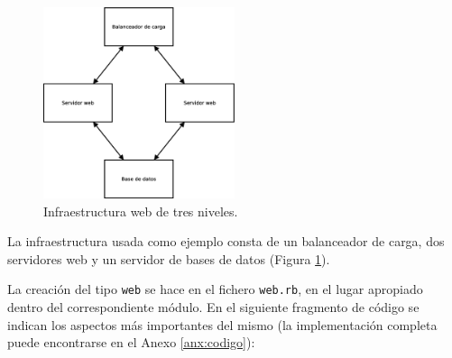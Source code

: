 \begin{figure} [!htbp]
  \centering
  \includegraphics[width=0.5\textwidth]{figuras/Arquitectura_Web2.eps}
  \caption{Infraestructura web de tres niveles.}
\label{figure:arquitectura-web}
\end{figure}

La infraestructura usada como ejemplo consta de un balanceador de carga, dos servidores web y un servidor de bases de datos (Figura \ref{figure:arquitectura-web}).


\pagebreak

La creación del tipo \texttt{web} se hace en el fichero \texttt{web.rb}, en el lugar apropiado dentro del correspondiente módulo. En el siguiente fragmento de código se indican los aspectos más importantes del mismo (la implementación completa puede encontrarse en el Anexo \ref{anx:codigo}):

